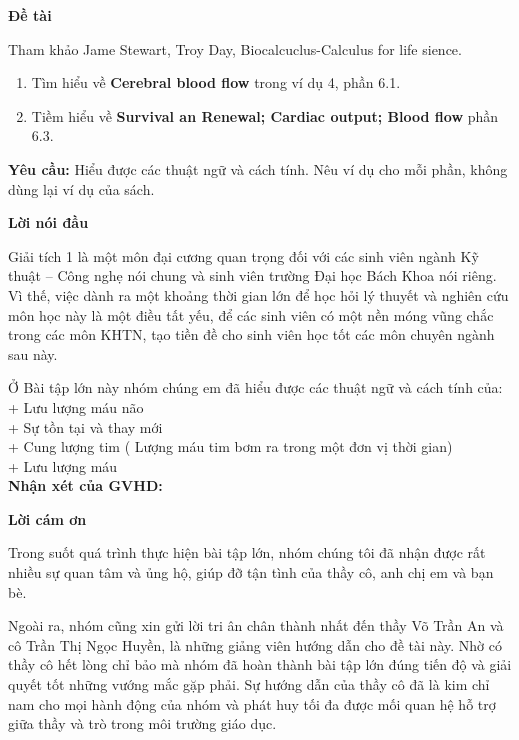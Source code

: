 \documentclass[12pt,a4paper]{article}
\begin{document}
\begin{center}
	\textbf{Đề tài}
\end{center}

Tham khảo Jame Stewart, Troy Day, Biocalcuclus-Calculus for life sience.
\begin{enumerate} [1.]
	\item Tìm hiểu về \textbf{Cerebral blood flow} trong ví dụ 4, phần 6.1.
	\item Tiềm hiểu về \textbf{Survival an Renewal; Cardiac output; Blood flow} phần 6.3.
\end{enumerate}


\textbf{Yêu cầu:} Hiểu được các thuật ngữ và cách tính. Nêu ví dụ cho mỗi phần, không dùng lại ví dụ của sách.
\newpage
\begin{center}
	\textbf{Lời nói đầu}
\end{center}

Giải tích 1 là một môn đại cương quan trọng đối với các sinh viên ngành Kỹ thuật – Công nghẹ nói chung và sinh viên trường Đại học Bách Khoa nói riêng. Vì thế, việc dành ra một khoảng thời gian lớn để học hỏi lý thuyết và nghiên cứu môn học này là một điều tất yếu, để các sinh viên có một nền móng vũng chắc trong các môn KHTN, tạo tiền đề cho sinh viên học tốt các môn chuyên ngành sau này.\newline


Ở Bài tập lớn này nhóm chúng em đã hiểu được các thuật ngữ và cách tính của:\\
+ Lưu lượng máu não\\
+ Sự tồn tại và thay mới\\
+ Cung lượng tim ( Lượng máu tim bơm ra trong một đơn vị thời gian)\\
+ Lưu lượng máu \\


\textbf{Nhận xét của GVHD:}

\newpage
\begin{center}
	\textbf{Lời cám ơn}
\end{center}

Trong suốt quá trình thực hiện bài tập lớn, nhóm chúng tôi đã nhận được rất nhiều sự quan tâm và ủng hộ, giúp đỡ tận tình của thầy cô, anh chị em và bạn bè.


Ngoài ra, nhóm cũng xin gửi lời tri ân chân thành nhất đến thầy Võ Trần An và cô Trần Thị Ngọc Huyền, là những giảng viên hướng dẫn cho đề tài  này. Nhờ có thầy cô hết lòng chỉ bảo mà nhóm đã hoàn thành bài tập lớn đúng tiến độ và giải quyết tốt những vướng mắc gặp phải. Sự hướng dẫn của thầy cô đã là kim chỉ nam cho mọi hành động của nhóm và phát huy tối đa được mối quan hệ hỗ trợ giữa thầy  và trò trong môi trường giáo dục.
\end{document}
